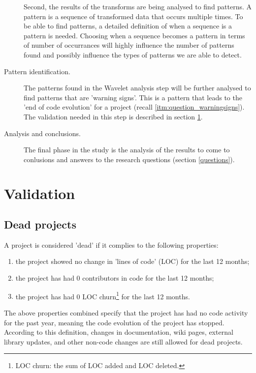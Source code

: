 \begin{description}
	Second, the results of the transforms are being analysed to find patterns. A
	pattern is a sequence of transformed data that occurs multiple times. To be
	able to find patterns, a detailed definition of when a sequence is a
	pattern is needed. Choosing when a sequence becomes a pattern in terms of
	number of occurrances will highly influence the number of patterns found and
	possibly influence the types of patterns we are able to detect.
	
	\item[Pattern identification.] The patterns found in the Wavelet analysis step
	will be further analysed to find patterns that are 'warning signs'. This is a
	pattern that leads to the 'end of code evolution' for a project (recall
	\ref{itm:question_warningsigns}). The validation needed in this step is
	described in section \ref{method:validation}.
	
	\item[Analysis and conclusions.] The final phase in the study is the analysis
	of the results to come to conlusions and answers to the research questions
	(section \ref{questions}).
\end{description}

\section{Validation}
\label{method:validation}
\subsection{Dead projects}
\label{def:dead}
A project is considered 'dead' if it complies to the following properties:
\begin{enumerate}
	\item the project showed no change in 'lines of code' (LOC) for the last 12
	months;
	\item the project has had 0 contributors in code for the last 12 months;
	\item the project has had 0 LOC churn\footnote{LOC churn: the sum of LOC added
	and LOC deleted.} for the last 12 months.
\end{enumerate}

\noindent
The above properties combined specify that the project has had no code activity
for the past year, meaning the code evolution of the project has stopped.
According to this definition, changes in documentation, wiki pages, external
library updates, and other non-code changes are still allowed for dead
projects.


